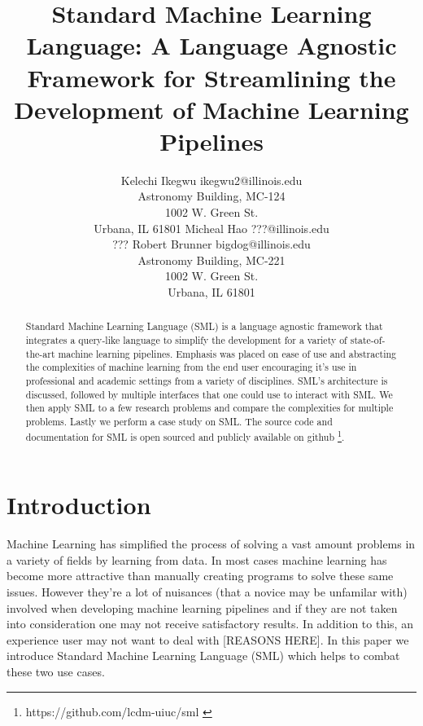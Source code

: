 \documentclass[jair,twoside,11pt,theapa]{article}
\begin{document}
\title{Standard Machine Learning Language: A Language Agnostic Framework for Streamlining the Development of Machine Learning Pipelines}

\author{\name Kelechi Ikegwu \email ikegwu2@illinois.edu \\
        Astronomy Building, MC-124 \\1002 W. Green St.\\ Urbana, IL  61801
       \AND
       \name Micheal Hao  \email ???@illinois.edu \\
       \addr ???
       \AND
       \name Robert Brunner \email bigdog@illinois.edu\\
        Astronomy Building, MC-221 \\1002 W. Green St.\\ Urbana, IL  61801}


\maketitle


\begin{abstract}
Standard Machine Learning Language (SML) is a language agnostic framework that integrates a query-like language to simplify the development for a variety of state-of-the-art machine learning pipelines. Emphasis was placed on ease of use and abstracting the complexities of machine learning from the end user encouraging it's use in professional and academic settings from a variety of disciplines. SML's architecture is discussed, followed by multiple interfaces that one could use to interact with SML. We then apply SML to a few research problems and compare the complexities for multiple problems. Lastly we perform a case study on SML. The source code and documentation for SML is open sourced and publicly available on github \footnote{https://github.com/lcdm-uiuc/sml \label{SML:Github}}.
\end{abstract}

\section{Introduction}
\label{Introduction}

Machine Learning has simplified the process of solving a vast amount problems in a variety of fields by learning from data. In most cases machine learning has become more attractive than manually creating programs to solve these same issues. However they're a lot of nuisances (that a novice may be unfamilar with) involved when developing machine learning pipelines \cite{pedros:fewUsefulThings} and if they are not taken into consideration one may not receive satisfactory results. In addition to this, an experience user may not want to deal with [REASONS HERE]. In this paper we introduce Standard Machine Learning Language (SML)  which helps to combat these two use cases.
\end{document}
